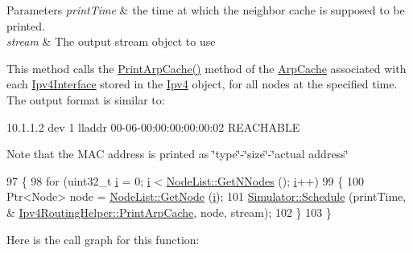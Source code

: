 \begin{DoxyParams}{Parameters}
{\em print\+Time} & the time at which the neighbor cache is supposed to be printed. \\
\hline
{\em stream} & The output stream object to use\\
\hline
\end{DoxyParams}
This method calls the \hyperlink{classns3_1_1Ipv4RoutingHelper_ae2bcc2aced34f45479b388fa16761e85}{Print\+Arp\+Cache()} method of the \hyperlink{classns3_1_1ArpCache}{Arp\+Cache} associated with each \hyperlink{classns3_1_1Ipv4Interface}{Ipv4\+Interface} stored in the \hyperlink{classns3_1_1Ipv4}{Ipv4} object, for all nodes at the specified time. The output format is similar to\+: \begin{DoxyVerb}10.1.1.2 dev 1 lladdr 00-06-00:00:00:00:00:02 REACHABLE
\end{DoxyVerb}
 Note that the M\+AC address is printed as \char`\"{}type\char`\"{}-\/\char`\"{}size\char`\"{}-\/\char`\"{}actual address\char`\"{} 
\begin{DoxyCode}
97 \{
98   \textcolor{keywordflow}{for} (uint32\_t \hyperlink{bernuolliDistribution_8m_a6f6ccfcf58b31cb6412107d9d5281426}{i} = 0; \hyperlink{bernuolliDistribution_8m_a6f6ccfcf58b31cb6412107d9d5281426}{i} < \hyperlink{classns3_1_1NodeList_a1d110b1670005895dd5812baab13682a}{NodeList::GetNNodes} (); \hyperlink{bernuolliDistribution_8m_a6f6ccfcf58b31cb6412107d9d5281426}{i}++)
99     \{
100       Ptr<Node> node = \hyperlink{classns3_1_1NodeList_a80ac09977d48d29db5c704ac8483cf6c}{NodeList::GetNode} (\hyperlink{bernuolliDistribution_8m_a6f6ccfcf58b31cb6412107d9d5281426}{i});
101       \hyperlink{classns3_1_1Simulator_a671882c894a08af4a5e91181bf1eec13}{Simulator::Schedule} (printTime, &
      \hyperlink{classns3_1_1Ipv4RoutingHelper_ae2bcc2aced34f45479b388fa16761e85}{Ipv4RoutingHelper::PrintArpCache}, node, stream);
102     \}
103 \}
\end{DoxyCode}


Here is the call graph for this function\+:


